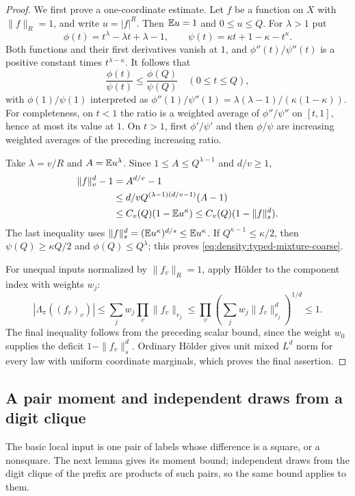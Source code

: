 \begin{proof}
We first prove a one-coordinate estimate. Let $f$ be a function on $X$ with $\|f\|_R=1$, and write $u=|f|^R$. Then $\mathbb E u=1$ and $0\le u\le Q$.
For $\lambda>1$ put
\[
 \phi(t)=t^\lambda-\lambda t+\lambda-1,
 \qquad\psi(t)=\kappa t+1-\kappa-t^\kappa.
\]
Both functions and their first derivatives vanish at $1$, and
$\phi''(t)/\psi''(t)$ is a positive constant times
$t^{\lambda-\kappa}$. It follows that
\[
 \frac{\phi(t)}{\psi(t)}\le\frac{\phi(Q)}{\psi(Q)}
 \quad(0\le t\le Q),
\]
with $\phi(1)/\psi(1)$ interpreted as $\phi''(1)/\psi''(1)=\lambda(\lambda-1)/(\kappa(1-\kappa))$. For completeness, on $t<1$
the ratio is a weighted average of $\phi''/\psi''$ on $[t,1]$, hence at most
its value at $1$. On $t>1$, first $\phi'/\psi'$ and then $\phi/\psi$ are
increasing weighted averages of the preceding increasing ratio.

Take $\lambda=v/R$ and $A=\mathbb E u^\lambda$. Since
$1\le A\le Q^{\lambda-1}$ and $d/v\ge1$,
\begin{align*}
 \|f\|_v^d-1
 &=A^{d/v}-1\\
 &\le d/v Q^{(\lambda-1)(d/v-1)}(A-1)\\
 &\le C_v(Q)(1-\mathbb E u^\kappa)
 \le C_v(Q)(1-\|f\|_s^d).
\end{align*}
The last inequality uses $\|f\|_s^d=(\mathbb E u^\kappa)^{d/s}\le\mathbb E u^\kappa$.
If $Q^{\kappa-1}\le\kappa/2$, then
$\psi(Q)\ge\kappa Q/2$ and $\phi(Q)\le Q^\lambda$; this proves
\eqref{eq:density:typed-mixture-coarse}.

For unequal inputs normalized by $\|f_v\|_R=1$, apply H\"older to the
component index with weights $w_j$:
\[
 |\Lambda_\pi((f_v)_v)|
 \le\sum_jw_j\prod_v\|f_v\|_{r_j}
 \le\prod_v\left(\sum_jw_j\|f_v\|_{r_j}^d\right)^{1/d}\le1.
\]
The final inequality follows from the preceding scalar bound, since the
weight $w_0$ supplies the deficit $1-\|f_v\|_s^d$. Ordinary H\"older gives
unit mixed $L^d$ norm for every law with uniform coordinate marginals,
which proves the final assertion.
\end{proof}

\subsection{A pair moment and independent draws from a digit clique}

The basic local input is one pair of labels whose difference is a
square, or a nonsquare. The next lemma gives its moment bound;
independent draws from the digit clique of the prefix are products
of such pairs, so the same bound applies to them.

